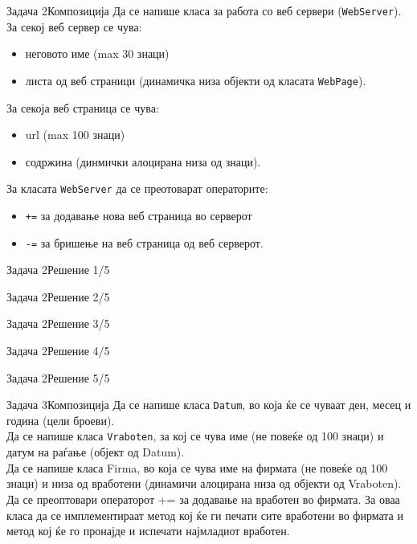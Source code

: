 \begin{frame}{Задача 2}{Композиција}
Да се напише класа за работа со веб сервери (\texttt{WebServer}). За секој веб
сервер се чува:
\begin{itemize}
  \item неговото име (max 30 знаци)
  \item листа од веб страници (динамичка низа објекти од класата
  \texttt{WebPage}).
\end{itemize}
За секоја веб страница се чува:
\begin{itemize}
  \item url (max 100 знаци)
  \item содржина (динмички алоцирана низа од знаци). 
\end{itemize}
За класата \texttt{WebServer} да се преотоварат операторите:
\begin{itemize}
  \item \texttt{+=} за додавање нова веб страница во серверот
  \item \texttt{-=} за бришење на веб страница од веб серверот. 
\end{itemize}

\end{frame}

\begin{frame}[fragile]{Задача 2}{Решение 1/5}

\end{frame}

\begin{frame}[fragile]{Задача 2}{Решение 2/5}

\end{frame}

\begin{frame}[fragile,shrink=10]{Задача 2}{Решение 3/5}

\end{frame}

\begin{frame}[fragile]{Задача 2}{Решение 4/5}

\end{frame}

\begin{frame}[fragile]{Задача 2}{Решение 5/5}

\end{frame}

\begin{frame}{Задача 3}{Композиција}
Да се напише класа \texttt{Datum}, во која ќе се чуваат ден, месец и година (цели
броеви).\\
Да се напише класа \texttt{Vraboten}, за кој се чува име (не повеќе од 100
знаци) и датум на раѓање (објект од Datum).\\ 
Да се напише класа Firma, во која се чува име на фирмата (не повеќе од 100
знаци) и низа од вработени (динамичи алоцирана низа од објекти од Vraboten).
Да се преоптовари операторот += за додавање на вработен во фирмата.
За оваа класа да се имплементираат метод кој ќе ги печати
сите вработени во фирмата и метод кој ќе го пронајде и испечати најмладиот вработен.
\end{frame}

